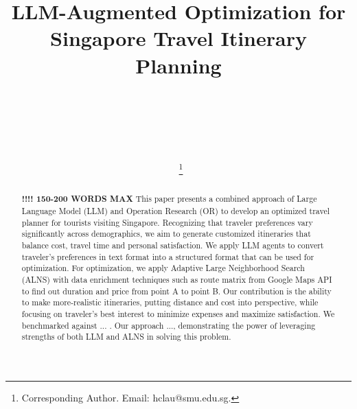 \documentclass{ecai}
\begin{document}

\begin{frontmatter}




\title{LLM-Augmented Optimization for Singapore Travel Itinerary Planning}


\author[A]
{~}

\author[A]
{}

\author[A]
{~}

\author[A]
{~}

\author[A]
{~\thanks{Corresponding Author. Email: hclau@smu.edu.sg.}}

\address[A]{School of Computing and Information Systems, Singapore Management University}


\begin{abstract}
\textbf{!!!! 150-200 WORDS MAX} This paper presents a combined approach of Large Language Model (LLM) and Operation Research (OR) to develop an optimized travel planner for tourists visiting Singapore. Recognizing that traveler preferences vary significantly across demographics, we aim to generate customized itineraries that balance cost, travel time and personal satisfaction. We apply LLM agents to convert traveler's preferences in text format into a structured format that can be used for optimization. For optimization, we apply Adaptive Large Neighborhood Search (ALNS) with data enrichment techniques such as route matrix from Google Maps API to find out duration and price from point A to point B. Our contribution is the ability to make more-realistic itineraries, putting distance and cost into perspective, while focusing on traveler's best interest to minimize expenses and maximize satisfaction. We benchmarked against ... . Our approach ..., demonstrating the power of leveraging strengths of both LLM and ALNS in solving this problem.

\end{abstract}

\end{frontmatter}
\end{document}
